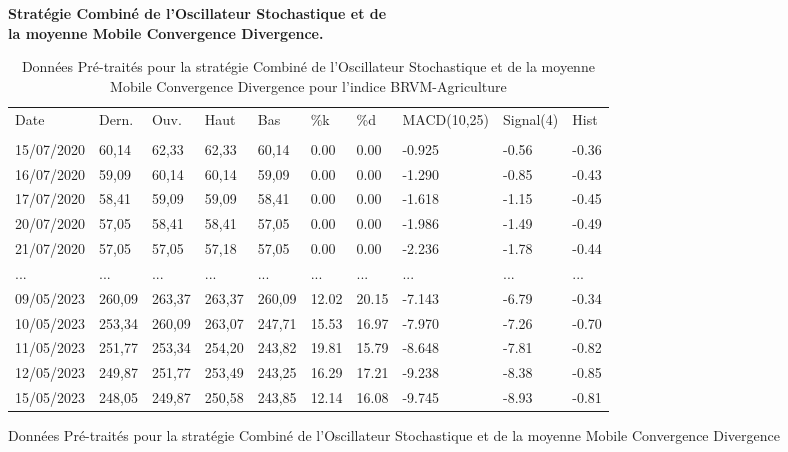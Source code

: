 \begin{samepage}
\textbf{Stratégie Combiné de l'Oscillateur Stochastique et de}\\
\textbf{ la moyenne Mobile Convergence Divergence. }

	\begin{center}
	\begin{table}[ht]
		\centering
		\caption{Données Pré-traités pour la stratégie Combiné de 
		l'Oscillateur Stochastique et de la moyenne Mobile Convergence Divergence 
		pour l'indice BRVM-Agriculture}\label{tab:multirow}
		\begin{tabular}{p{1.5cm}p{1cm}p{1.5cm}p{1cm}p{1cm}p{1cm}p{1cm}p{1.5cm}p{1.5cm}p{1.5cm}}
			\hline
			Date 		&Dern.	&Ouv.	&Haut	&Bas	&\%k	&\%d	&MACD(10,25)	&Signal(4)	&Hist \\ \\
			\hline                                                                  
			15/07/2020	&60,14	&62,33	&62,33	&60,14	&0.00	&0.00	&-0.925	&-0.56	&-0.36 \\ 
			16/07/2020	&59,09	&60,14	&60,14	&59,09	&0.00	&0.00	&-1.290	&-0.85	&-0.43	\\
			17/07/2020	&58,41	&59,09	&59,09	&58,41	&0.00	&0.00	&-1.618	&-1.15	&-0.45\\ 
			20/07/2020	&57,05	&58,41	&58,41	&57,05	&0.00	&0.00	&-1.986	&-1.49	&-0.49\\ 
			21/07/2020	&57,05	&57,05	&57,18	&57,05	&0.00	&0.00	&-2.236	&-1.78	&-0.44\\
			...			&...	&...	&...	&...	&...	&...	&...	&...	&... \\ 
			09/05/2023	&260,09	&263,37	&263,37	&260,09	&12.02	&20.15	&-7.143	&-6.79	&-0.34 \\
			10/05/2023	&253,34	&260,09	&263,07	&247,71	&15.53	&16.97	&-7.970	&-7.26	&-0.70 \\
			11/05/2023	&251,77	&253,34	&254,20	&243,82	&19.81	&15.79	&-8.648	&-7.81	&-0.82\\ 
			12/05/2023	&249,87	&251,77	&253,49	&243,25	&16.29	&17.21	&-9.238	&-8.38	&-0.85\\ 
			15/05/2023	&248,05	&249,87	&250,58	&243,85	&12.14	&16.08	&-9.745	&-8.93	&-0.81 \\
			\hline
		\end{tabular}
	\end{table}%
	\newpage
	\begin{table}[ht]
		\centering
		\caption{Données Pré-traités pour la stratégie Combiné de 
		l'Oscillateur Stochastique et de la moyenne Mobile Convergence Divergence
}
\end{table}
\end{center}
\end{samepage}
